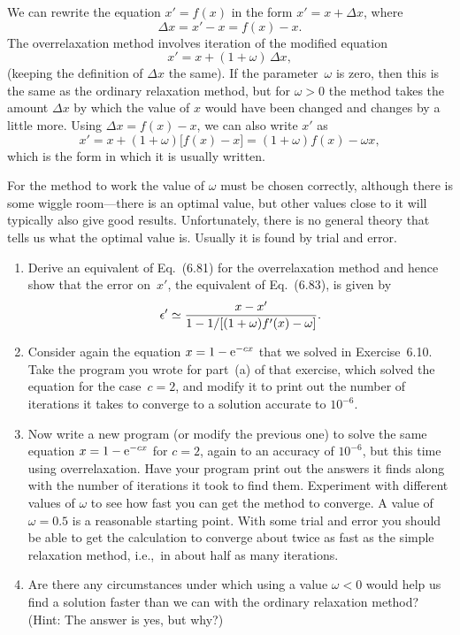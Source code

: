 \documentclass[12pt]{article}
\begin{document}
\begin{exercises}
We can rewrite the equation $x'=f(x)$ in the form $x' = x + \Delta x$,
where
\begin{displaymath}
\Delta x = x' - x = f(x) - x.
\end{displaymath}
The overrelaxation method involves iteration of the modified equation
\begin{displaymath}
x' = x + (1+\omega)\,\Delta x,
\end{displaymath}
(keeping the definition of $\Delta x$ the same).  If the parameter~$\omega$
is zero, then this is the same as the ordinary relaxation method, but for
$\omega>0$ the method takes the amount $\Delta x$ by which the value of $x$
would have been changed and changes by a little more.  Using $\Delta
x=f(x)-x$, we can also write $x'$ as
\begin{displaymath}
x' = x + (1+\omega) \bigl[ f(x) - x \bigr]
   = (1+\omega) f(x) - \omega x,
\end{displaymath}
which is the form in which it is usually written.

For the method to work the value of $\omega$ must be chosen correctly,
although there is some wiggle room---there is an optimal value, but other
values close to it will typically also give good results.  Unfortunately,
there is no general theory that tells us what the optimal value is.
Usually it is found by trial and error.
\begin{enumerate}\setlength{\itemsep}{0pt}
\item Derive an equivalent of Eq.~(6.81) for the overrelaxation method and
  hence show that the error on~$x'$, the equivalent of Eq.~(6.83), is given
  by
\begin{displaymath}
\epsilon' \simeq {x-x'\over1-1/[(1+\omega) f'(x)-\omega]}.
\end{displaymath}
\item Consider again the equation $x=1-\mathrm{e}^{-cx}$ that we solved in
  Exercise~6.10.  Take the program you wrote for part~(a) of that exercise,
  which solved the equation for the case~$c=2$, and modify it to print out
  the number of iterations it takes to converge to a solution accurate to
  $10^{-6}$.
\item Now write a new program (or modify the previous one) to solve the
  same equation $x=1-\mathrm{e}^{-cx}$ for $c=2$, again to an accuracy of
  $10^{-6}$, but this time using overrelaxation.  Have your program print
  out the answers it finds along with the number of iterations it took to
  find them.  Experiment with different values of $\omega$ to see how fast
  you can get the method to converge.  A value of $\omega=0.5$ is a
  reasonable starting point.  With some trial and error you should be able
  to get the calculation to converge about twice as fast as the simple
  relaxation method, i.e.,~in about half as many iterations.
\item Are there any circumstances under which using a value $\omega<0$
  would help us find a solution faster than we can with the ordinary
  relaxation method?  (Hint: The answer is yes, but why?)
\end{enumerate}



\end{exercises}
\end{document}
